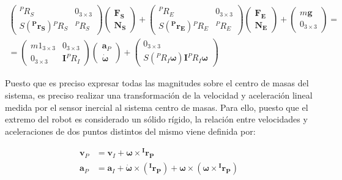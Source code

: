 \begin{equation}
\begin{split}
	\begin{pmatrix}
		{^PR_S} & 0_{3\times3} \\ S(\boldsymbol{^Pr_S}){^PR_S} & {^PR_S}
	\end{pmatrix}
	\begin{pmatrix}
		\boldsymbol{F_S} \\ \boldsymbol{N_S}
	\end{pmatrix} +
	\begin{pmatrix}
		{^PR_E} & 0_{3\times3} \\ S(\boldsymbol{^Pr_E}){^PR_E} & {^PR_E}
	\end{pmatrix}
	\begin{pmatrix}
		\boldsymbol{F_E} \\ \boldsymbol{N_E}
	\end{pmatrix} +
	\begin{pmatrix}
		m\boldsymbol{g} \\ 0_{3\times3}
	\end{pmatrix}
	= \\ =
	\begin{pmatrix}
		m1_{3\times3} & 0_{3\times3} \\ 0_{3\times3} & \boldsymbol{I} {^PR_I}
	\end{pmatrix}
	\begin{pmatrix}
		\boldsymbol{a}_P \\ \boldsymbol{\dot{\omega}}
	\end{pmatrix} +
	\begin{pmatrix}
		0_{3\times3} \\ S({^PR_I}\boldsymbol{\omega}) \boldsymbol{I} {^PR_I} \boldsymbol{\omega}
	\end{pmatrix}
\end{split}
\label{eq:newtoneuler2}	
\end{equation} \par

Puesto que es preciso expresar todas las magnitudes sobre el centro de masas del sistema, es preciso realizar una transformación de la velocidad y aceleración lineal medida por el sensor inercial al sistema centro de masas. Para ello, puesto que el extremo del robot es considerado un sólido rígido, la relación entre velocidades y aceleraciones de dos puntos distintos del mismo viene definida por:

\begin{subequations}
\begin{align}
	\boldsymbol{v}_P &= \boldsymbol{v}_I +\boldsymbol{\omega}\times\boldsymbol{^Ir_P} \label{eq:convVel}\\
	\boldsymbol{a}_P &= \boldsymbol{a}_I + \boldsymbol{\dot{\omega}}\times(\boldsymbol{^Ir_P}) +
	\boldsymbol{\omega}\times(\boldsymbol{\omega}\times\boldsymbol{^Ir_P})
	\label{eq:convAcc}
\end{align}
\end{subequations}

